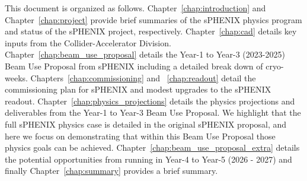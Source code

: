 This document is organized as follows.    Chapter~\ref{chap:introduction} and Chapter~\ref{chap:project} provide brief summaries of the sPHENIX physics program and status of the sPHENIX project, respectively.    Chapter~\ref{chap:cad} details key inputs from the Collider-Accelerator Division.   Chapter~\ref{chap:beam_use_proposal} details the Year-1 to Year-3 (2023-2025) Beam Use Proposal from sPHENIX including a detailed break down of cryo-weeks.    Chapters~\ref{chap:commissioning} and ~\ref{chap:readout} detail the commissioning plan for sPHENIX and modest upgrades to the sPHENIX readout.    Chapter~\ref{chap:physics_projections} details the physics projections and deliverables from the Year-1 to Year-3 Beam Use Proposal.    We highlight that the full sPHENIX physics case is detailed in the original sPHENIX proposal, and here we focus on demonstrating that within this Beam Use Proposal those physics goals can be achieved.   Chapter~\ref{chap:beam_use_proposal_extra} details the potential opportunities from running in Year-4 to Year-5 (2026 - 2027) and finally Chapter~\ref{chap:summary} provides a brief summary. 

%


